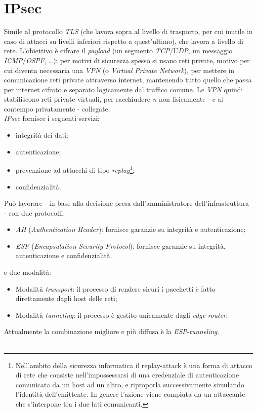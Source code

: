 \section{IPsec}
Simile al protocollo \textit{TLS} (che lavora sopra al livello di trasporto, per cui inutile in caso di attacci su livelli inferiori rispetto a quest'ultimo), che lavora a livello di rete. L'obiettivo è cifrare il \textit{payload} (un segmento \textit{TCP}/U\textit{DP}, un messaggio \textit{ICMP}/\textit{OSPF}, \ldots): per motivi di sicurezza spesso si usano reti private, motivo per cui diventa necessaria una \textit{VPN} (o \textit{Virtual Private Network}), per mettere in comunicazione reti private attraverso internet, mantenendo tutto quello che passa per internet cifrato e separato logicamente dal traffico comune. Le \textit{VPN} quindi stabiliscono reti private virtuali, per racchiudere \textit{n} non fisicamente - e al contempo privatamente - collegate. \\
\textit{IPsec} fornisce i seguenti servizi:
\begin{itemize}
	\item integrità dei dati;
	\item autenticazione;
	\item prevenzione ad attacchi di tipo \textit{replay}\footnote{Nell'ambito della sicurezza informatica il replay-attack è una forma di attacco di rete che consiste nell'impossessarsi di una credenziale di autenticazione comunicata da un host ad un altro, e riproporla successivamente simulando l'identità dell'emittente. In genere l'azione viene compiuta da un attaccante che s'interpone tra i due lati comunicanti.};
	\item confidenzialità.
\end{itemize}
Può lavorare - in base alla decisione presa dall'amministratore dell'infrastruttura - con due protocolli:
\begin{itemize}
	\item \textit{AH} (\textit{Authentication Header}): fornisce garanzie su integrità e autenticazione;
	\item \textit{ESP} (\textit{Encapsulation Security Protocol}): fornisce garanzie su integrità, autenticazione e confidenzialità.
\end{itemize}
e due modalità:
\begin{itemize}
	\item Modalità \textit{transport}: il processo di rendere sicuri i pacchetti è fatto direttamente dagli host delle reti;
	\item Modalità \textit{tunneling}: il processo è gestito unicamente dagli \textit{edge router}.
\end{itemize}
Attualmente la combinazione migliore e più diffusa è la \textit{ESP}-\textit{tunneling}. \\ \\

